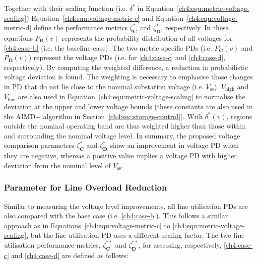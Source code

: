 



Together with their scaling function (i.e. $\delta^{*}$ in Equation~\ref{ch4:equ:metric-voltage-scaling}) Equation~\ref{ch4:equ:voltage-metric-c} and Equation~\ref{ch4:equ:voltage-metric-d} define the performance metrics $\zeta_\textbf{C}^{*}$ and $\zeta_\textbf{D}^{*}$, respectively.
In these equations $P_\textbf{B}(v)$ represents the probability distribution of all voltages for \ref{ch4:case-b} (i.e. the baseline case).
The two metric specific PDs (i.e. $P_\textbf{C}(v)$ and $P_\textbf{D}(v)$) represent the voltage PDs (i.e. for \ref{ch4:case-c} and \ref{ch4:case-d}, respectively).
By computing the weighted difference, a reduction in probabilistic voltage deviation is found.
The weighting is necessary to emphasise those changes in PD that do not lie close to the nominal substation voltage (i.e. $V_\text{ss}$).
$V_\text{high}$ and $V_\text{low}$ are also used in Equation~\ref{ch4:equ:metric-voltage-scaling} to normalise the deviation at the upper and lower voltage bounds (these constants are also used in the AIMD+ algorithm in Section~\ref{ch4:sec:storage-control}).
With $\delta^{*}(v)$, regions outside the nominal operating band are thus weighted higher than those within and surrounding the nominal voltage level.
In summary, the proposed voltage comparison parameters $\zeta^*_\textbf{C}$ and $\zeta^*_\textbf{D}$ show an improvement in voltage PD when they are negative, whereas a positive value implies a voltage PD with higher deviation from the nominal level of $V_\text{ss}$.

\subsubsection{Parameter for Line Overload Reduction}

Similar to measuring the voltage level improvements, all line utilisation PDs are also compared with the base case (i.e. \ref{ch4:case-b}).
This follows a similar approach as in Equations~\ref{ch4:equ:voltage-metric-c} to \ref{ch4:equ:metric-voltage-scaling}, but the line utilisation PD uses a different scaling factor.
The two line utilisation performance metrics, $\zeta_\textbf{C}^{**}$ and $\zeta_\textbf{D}^{**}$, for assessing, respectively, \ref{ch4:case-c} and   \ref{ch4:case-d} are defined as follows:

